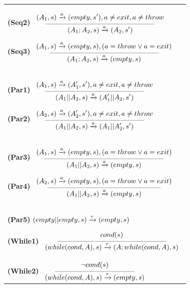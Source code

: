 \begin{table}[!h]
{{\begin{tabular}{l}
\textbf{(Seq2)}
$\reglaa{ %
(A_1,s)\xrightarrow{a}(empty,s'), a\neq exit,  a\neq throw
}
{ %
(A_1;A_2,s)
\xrightarrow{a}
(A_2,s')
}{5.5}$



\hspace{2.4cm}\textbf{(Seq3)}
$\reglaa{ %
(A_1,s)\xrightarrow{a}(empty,s), (a=throw \vee a=exit)
}
{ %
(A_1;A_2,s)
\xrightarrow{a}
(empty,s)
}{5.5}$

\\[0.4cm]

\textbf{(Par1)}
$\reglaa{ %
(A_1,s)\xrightarrow{a}(A'_1,s'), a\neq exit, a\neq throw
}
{ %
(A_1||A_2,s)
\xrightarrow{a}
(A'_1||A_2,s')
}{5}$


\hspace{3cm}\textbf{(Par2)}
$\reglaa{ %
(A_2,s)\xrightarrow{a}(A'_2,s'), a\neq exit, a\neq throw
}
{ %
(A_1||A_2,s)
\xrightarrow{a}
(A_1||A'_2,s')
}{5}$


\\[0.4cm]

\textbf{(Par3)}
$\reglaa{ %
(A_1,s)\xrightarrow{a}(empty,s), (a=throw \vee a=exit)
}
{ %
(A_1||A_2,s)
\xrightarrow{a}
(empty,s)
}{6}$



\hspace{2cm}\textbf{(Par4)}
$\reglaa{ %
(A_2,s)\xrightarrow{a}(empty,s), (a=throw \vee a=exit)
}
{ %
(A_1||A_2,s)
\xrightarrow{a}
(empty,s)
}{5.7}$


\\[0.4cm]
\textbf{(Par5)}
${ %
(empty||empty,s)
\xrightarrow{\tau}
(empty,s)
}$


\hspace{4cm}\textbf{(While1)}
$\reglaa{ %
cond(s)
}
{ %
(while(cond,A),s)
\xrightarrow{\tau}
(A ; while(cond,A),s)
}{5.5}$

\\[0.3cm]

\textbf{(While2)}
$\reglaa{ %
\neg cond(s)
}
{ %
(while(cond,A),s)
\xrightarrow{\tau}
(empty,s)
}{4}$


\end{tabular}}}
\end{table}
